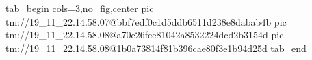  
 
 
 
 

\qqSecOrig


\ifcmt
  tab_begin cols=3,no_fig,center
    pic tm://19_11_22.14.58.07@bbf7edf0c1d5ddb6511d238e8dabab4b
    pic tm://19_11_22.14.58.08@a70e26fce81042a8532224dcd2b3154d
    pic tm://19_11_22.14.58.08@1b0a73814f81b396cae80f3e1b94d25d
  tab_end
\fi

